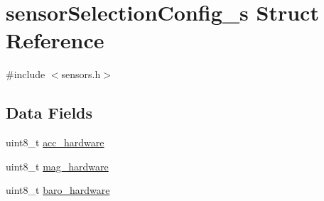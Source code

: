 \hypertarget{structsensorSelectionConfig__s}{\section{sensor\+Selection\+Config\+\_\+s Struct Reference}
\label{structsensorSelectionConfig__s}
}


{\ttfamily \#include $<$sensors.\+h$>$}

\subsection*{Data Fields}
\begin{DoxyCompactItemize}
\item 
uint8\+\_\+t \hyperlink{structsensorSelectionConfig__s_a56ed81e3b2343ecef89ae9c4a41bf50c}{acc\+\_\+hardware}
\item 
uint8\+\_\+t \hyperlink{structsensorSelectionConfig__s_ad4a9d0d918534bb78a27bb2686067896}{mag\+\_\+hardware}
\item 
uint8\+\_\+t \hyperlink{structsensorSelectionConfig__s_afa00ae561019b3621f2ba67cec868f4c}{baro\+\_\+hardware}
\end{DoxyCompactItemize}


